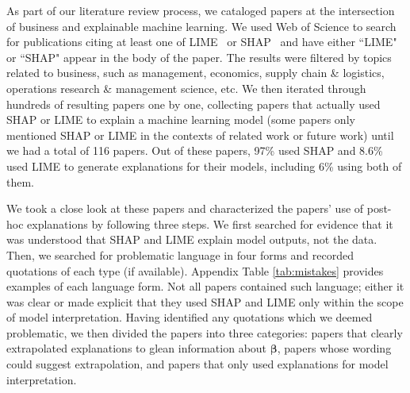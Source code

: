 \documentclass[mnsc,blindrev]{informs3}
\begin{document}
        As part of our literature review process, we cataloged papers at the intersection of business and explainable machine learning. We used Web of Science to search for publications citing at least one of LIME~\citep{ribeiro16lime} or SHAP~\citep{lundberg17shap} and have either ``LIME" or ``SHAP" appear in the body of the paper.  The results were filtered by topics related to business, such as management, economics, supply chain \& logistics, operations research \& management science, etc. 
        We then iterated through hundreds of resulting papers one by one, collecting papers that actually used SHAP or LIME to explain a machine learning model (some papers only mentioned SHAP or LIME in the contexts of related work or future work) until we had a total of 116 papers. Out of these papers, 97\% used SHAP and 8.6\% used LIME to generate explanations for their models, including 6\% using both of them.

        
        We took a close look at these papers and characterized the papers' use of post-hoc explanations by following three steps. We first searched for evidence that it was understood that SHAP and LIME explain model outputs, not the data. Then, we searched for problematic language in four forms and recorded quotations of each type (if available). Appendix Table \ref{tab:mistakes} provides examples of each language form. Not all papers contained such language; either it was clear or made explicit that they used SHAP and LIME only within the scope of model interpretation. Having identified any quotations which we deemed problematic, we then divided the papers into three categories: papers that clearly extrapolated explanations to glean information about $\boldsymbol{\beta}$, papers whose wording could suggest extrapolation, and papers that only used explanations for model interpretation.%
\end{document}
